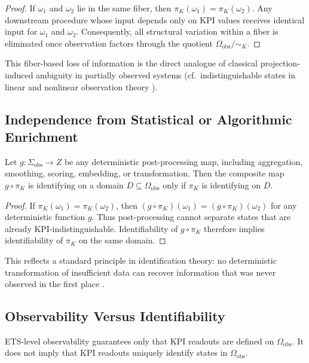 \begin{proof}
If \(\omega_1\) and \(\omega_2\) lie in the same fiber, then
\(\pi_K(\omega_1)=\pi_K(\omega_2)\).
Any downstream procedure whose input depends only on KPI values receives
identical input for \(\omega_1\) and \(\omega_2\).
Consequently, all structural variation within a fiber is eliminated once
observation factors through the quotient
\(\Omega_{\mathrm{obs}}/\!\sim_K\).
\end{proof}

This fiber-based loss of information is the direct analogue of classical
projection-induced ambiguity in partially observed systems
(cf.\ indistinguishable states in linear and nonlinear observation theory
\cite{kalman1960,slotine1991}).

\subsection{Independence from Statistical or Algorithmic Enrichment}

\begin{proposition}
\label{prop:no-pp}
Let \(g:\Sigma_{\mathrm{obs}}\to Z\) be any deterministic post-processing map,
including aggregation, smoothing, scoring, embedding, or transformation.
Then the composite map \(g\circ\pi_K\) is identifying on a domain
\(D\subseteq\Omega_{\mathrm{obs}}\) only if \(\pi_K\) is identifying on \(D\).
\end{proposition}

\begin{proof}
If \(\pi_K(\omega_1)=\pi_K(\omega_2)\), then
\((g\circ\pi_K)(\omega_1)=(g\circ\pi_K)(\omega_2)\) for any deterministic function
\(g\).
Thus post-processing cannot separate states that are already
KPI-indistinguishable.
Identifiability of \(g\circ\pi_K\) therefore implies identifiability of
\(\pi_K\) on the same domain.
\end{proof}

This reflects a standard principle in identification theory: no deterministic
transformation of insufficient data can recover information that was never
observed in the first place \cite{ljung1999,walter1982}.

\subsection{Observability Versus Identifiability}

\begin{proposition}
\label{prop:obs-vs-id}
ETS-level observability guarantees only that KPI readouts are defined on
\(\Omega_{\mathrm{obs}}\).
It does not imply that KPI readouts uniquely identify states in
\(\Omega_{\mathrm{obs}}\).
\end{proposition}

